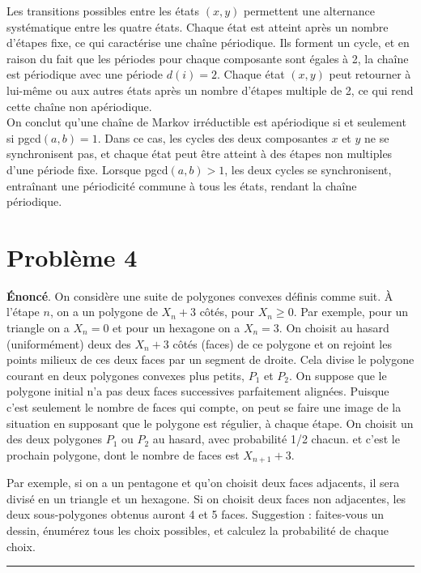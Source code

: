 \documentclass{article}
\begin{document}
Les transitions possibles entre les états $(x,y)$ permettent une alternance systématique 
entre les quatre états. Chaque état est atteint après un nombre d'étapes fixe, ce qui caractérise 
une chaîne périodique. Ils forment un cycle, et en raison du fait que les périodes pour chaque 
composante sont égales à 2, la chaîne est périodique avec une période $d(i)=2$. Chaque état 
$(x,y)$ peut retourner à lui-même ou aux autres états après un nombre d'étapes multiple de 2, 
ce qui rend cette chaîne non apériodique. \\

\noindent On conclut qu'une chaîne de Markov irréductible est apériodique si et seulement si 
pgcd$(a,b)=1$. Dans ce cas, les cycles des deux composantes $x$ et $y$ ne se synchronisent pas, 
et chaque état peut être atteint à des étapes non multiples d'une période fixe. Lorsque
pgcd$(a,b)>1$, les deux cycles se synchronisent, entraînant une périodicité commune à tous 
les états, rendant la chaîne périodique.


\newpage
\section*{Problème 4}
\textbf{Énoncé}. On considère une suite de polygones convexes définis comme suit. 
À l'étape $n$, on a un polygone de $X_n+3$ côtés, pour $X_n\ge0$. Par exemple,
pour un triangle on a $X_n=0$ et pour un hexagone on a $X_n=3$. On choisit au hasard 
(uniformément) deux des $X_n+3$ côtés (faces) de ce polygone et on rejoint les points
milieux de ces deux faces par un segment de droite. Cela divise le polygone courant
en deux polygones convexes plus petits, $P_1$ et $P_2$. On suppose que le polygone 
initial n'a pas deux faces successives parfaitement alignées. Puisque c'est seulement
le nombre de faces qui compte, on peut se faire une image de la situation en supposant
que le polygone est régulier, à chaque étape. On choisit un des deux polygones $P_1$
ou $P_2$ au hasard, avec probabilité 1/2 chacun. et c'est le prochain polygone, dont
le nombre de faces est $X_{n+1}+3$.

\vspace{.3cm}
\noindent Par exemple, si on a un pentagone et qu'on choisit deux faces adjacents, 
il sera divisé en un triangle et un hexagone. Si on choisit deux faces non adjacentes, 
les deux sous-polygones obtenus auront 4 et 5 faces. Suggestion : faites-vous un 
dessin, énumérez tous les choix possibles, et calculez la probabilité de chaque choix.
\vspace{.6cm}
\hrule
\vspace{.2cm}
\end{document}
